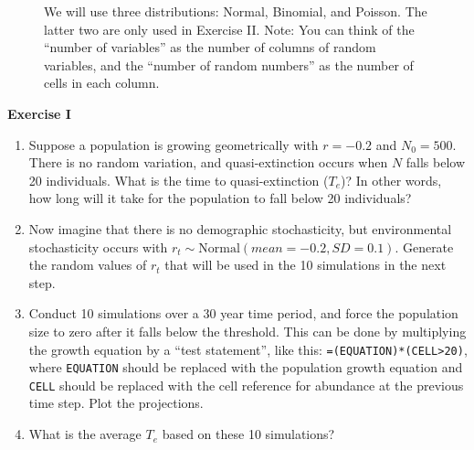 \documentclass[12pt]{article}\usepackage[]{graphicx}\usepackage[]{xcolor}
\begin{document}
\vspace{1cm}

\begin{figure}[h]
  \centering
  \caption{\footnotesize We will use three distributions: Normal,
    Binomial, and Poisson. The latter two are only used in Exercise
    II. Note: You can think of the ``number of variables'' as the
    number of columns of random variables, and the ``number of random
    numbers'' as the number of cells in each column.
  }
  \label{fig:rng-3}
\end{figure}


\clearpage



{\bf Exercise I \\}
\begin{enumerate}
  \item Suppose a population is growing geometrically with
    $r=-0.2$ and $N_0=500$. There is no random variation, and
    quasi-extinction occurs when $N$ falls below 20 individuals.
    What is the time to quasi-extinction ($T_e$)? In other words, how
    long will it take for the population to fall below 20 individuals?
  \item Now imagine that there is no demographic stochasticity,
    but environmental stochasticity occurs with $r_t \sim
    \mathrm{Normal}(mean=-0.2, SD=0.1)$. Generate the random values of $r_t$ that will be
    used in the 10 simulations in the next step.
  \item Conduct 10 simulations over a 30 year time period, and force
    the population size to zero after it falls below the threshold.
    This can be done by multiplying the
    growth equation by a ``test statement'', like this:
    {\tt =(EQUATION)*(CELL>20)}, where {\tt EQUATION} should be
    replaced with the population growth equation and {\tt CELL} should
    be replaced with the cell reference for abundance at the previous
    time step. Plot the projections.
  \item What is the average $T_e$ based on these 10 simulations?
\end{enumerate}
\end{document}
